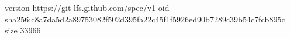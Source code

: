 version https://git-lfs.github.com/spec/v1
oid sha256:c8a7da5d2a89753082f502d395fa22c45f1f5926ed90b7289c39b54c7fcb895c
size 33966
